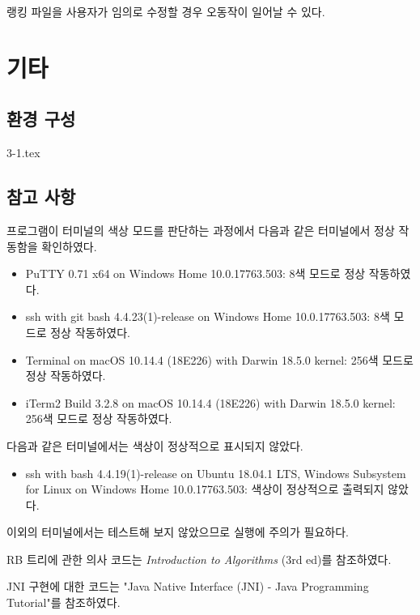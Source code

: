 랭킹 파일을 사용자가 임의로 수정할 경우 오동작이 일어날 수 있다.

\section{기타}
\subsection{환경 구성}
{3-1.tex}

\subsection{참고 사항}
프로그램이 터미널의 색상 모드를 판단하는 과정에서 다음과 같은 터미널에서 정상 작동함을 확인하였다.
\begin{itemize}
    \item PuTTY 0.71 x64 on Windows Home 10.0.17763.503: 8색 모드로 정상 작동하였다.
    \item ssh with git bash 4.4.23(1)-release on Windows Home 10.0.17763.503: 8색 모드로 정상 작동하였다.
    \item Terminal on macOS 10.14.4 (18E226) with Darwin 18.5.0 kernel: 256색 모드로 정상 작동하였다.
    \item iTerm2 Build 3.2.8 on macOS 10.14.4 (18E226) with Darwin 18.5.0 kernel: 256색 모드로 정상 작동하였다.
\end{itemize} 

다음과 같은 터미널에서는 색상이 정상적으로 표시되지 않았다.
\begin{itemize}
    \item ssh with bash 4.4.19(1)-release on Ubuntu 18.04.1 LTS, Windows Subsystem for Linux on Windows Home 10.0.17763.503: 색상이 정상적으로 출력되지 않았다.
\end{itemize}
  
이외의 터미널에서는 테스트해 보지 않았으므로 실행에 주의가 필요하다.

RB 트리에 관한 의사 코드는 \textit{Introduction to Algorithms} (3rd ed)\cite{CLRS}를 참조하였다.

JNI 구현에 대한 코드는 "Java Native Interface (JNI) - Java Programming Tutorial"\cite{JNI}를 참조하였다.

